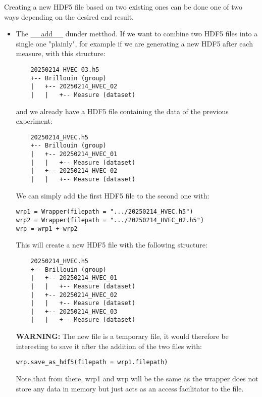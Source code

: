 Creating a new HDF5 file based on two existing ones can be done one of two ways depending on the desired end result.
\begin{itemize}
    \item The \hyperref[subchapter:wrapper.__add__]{\_\_add\_\_} dunder metthod. If we want to combine two HDF5 files into a single one "plainly", for example if we are generating a new HDF5 after each measure, with this structure:
    \begin{verbatim}
    20250214_HVEC_03.h5
    +-- Brillouin (group)
    |   +-- 20250214_HVEC_02
    |   |   +-- Measure (dataset)
    \end{verbatim}
    and we already have a HDF5 file containing the data of the previous experiment:
    \begin{verbatim}
    20250214_HVEC.h5
    +-- Brillouin (group)
    |   +-- 20250214_HVEC_01
    |   |   +-- Measure (dataset)
    |   +-- 20250214_HVEC_02
    |   |   +-- Measure (dataset)
    \end{verbatim}
    We can simply add the first HDF5 file to the second one with:
\begin{lstlisting}
wrp1 = Wrapper(filepath = ".../20250214_HVEC.h5")
wrp2 = Wrapper(filepath = ".../20250214_HVEC_02.h5")
wrp = wrp1 + wrp2
\end{lstlisting}
    This will create a new HDF5 file with the following structure:
    \begin{verbatim}
    20250214_HVEC.h5
    +-- Brillouin (group)
    |   +-- 20250214_HVEC_01
    |   |   +-- Measure (dataset)
    |   +-- 20250214_HVEC_02
    |   |   +-- Measure (dataset)
    |   +-- 20250214_HVEC_03
    |   |   +-- Measure (dataset)
    \end{verbatim}
    \textbf{WARNING:} The new file is a temporary file, it would therefore be interesting to save it after the addition of the two files with:
\begin{lstlisting}
wrp.save_as_hdf5(filepath = wrp1.filepath)
\end{lstlisting}
    Note that from there, wrp1 and wrp will be the same as the wrapper does not store any data in memory but just acts as an access facilitator to the file.


\end{itemize}
